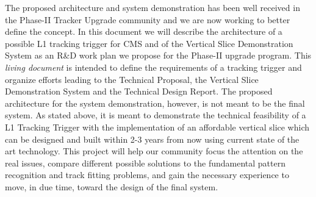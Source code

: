 \noindent The proposed architecture and system demonstration has been well received in the Phase-II Tracker Upgrade community and we are now working to better define the concept. In this document we will describe the architecture of a possible L1 tracking trigger for CMS and of the Vertical Slice Demonstration System as an R\&D work plan we propose for the Phase-II upgrade program.  This {\itshape living document} is intended to define the requirements of a tracking trigger and organize efforts leading to the Technical Proposal, the Vertical Slice Demonstration System and the Technical Design Report. The proposed architecture for the system demonstration, however, is not meant to be the final system.  As stated above, it is meant to demonstrate the technical feasibility of a L1 Tracking Trigger with the implementation of an affordable vertical slice which can be designed and built within 2-3 years from now using current state of the art technology. This project will help our community focus the attention on the real issues, compare different possible solutions to the fundamental pattern recognition and track fitting problems, and gain the necessary experience to move, in due time, toward the design of the final system.

\clearpage
